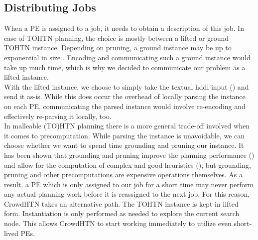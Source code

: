 \subsection{Distributing Jobs}
When a PE is assigned to a job, it needs to obtain a description of this job. In case of TOHTN planning, the choice is mostly between a lifted or ground TOHTN instance. Depending on pruning, a ground instance may be up to exponential in size \cite{behnke2020succinct}. Encoding and communicating such a ground instance would take up much time, which is why we decided to communicate our problem as a lifted instance. \\
With the lifted instance, we choose to simply take the textual hddl input (\cite{holler2020hddl}) and send it as-is. While this does occur the overhead of locally parsing the instance on each PE, communicating the parsed instance would involve re-encoding and effectively re-parsing it locally, too. \\
In malleable (TO)HTN planning there is a more general trade-off involved when it comes to precomputation. While parsing the instance is unavoidable, we can choose whether we want to spend time grounding and pruning our instance. It has been shown that grounding and pruning improve the planning performance (\cite{behnke2020succinct}) and allow for the computation of complex and good heuristics (\cite{holler2020htn}), but grounding, pruning and other precomputations are expensive operations themselves. As a result, a PE which is only assigned to our job for a short time may never perform any actual planning work before it is reassigned to the next job. For this reason, CrowdHTN takes an alternative path. The TOHTN instance is kept in lifted form. Instantiation is only performed as needed to explore the current search node. This allows CrowdHTN to start working immediately to utilize even short-lived PEs.
\begin{comment}
- grounded instance may be exponential in size
- exceedingly high communication cost
- lifted instance it is
- sending a parsed instance - we still need to encode and decode it for sending
- we would effectively have to build a parser for this
- we already do have a parser
- we simply encode the string and parse locally
- not a core issue to us, so we go for ease of implementation
\end{comment}

